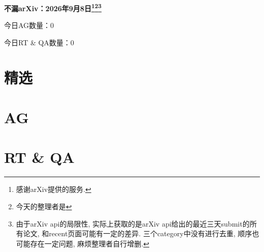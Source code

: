\documentclass[9pt, a4paper]{article}
\theoremstyle{plain}
\theoremstyle{definition}
\theoremstyle{remark}
\newcommand{\AGnumber}{0}
\newcommand{\RTQAnumber}{0}
\newcommand{\NewestDate}{2026年9月8日}
\newcommand{\todayarXiver}{} %
\begin{document}
\begin{center}
    \Huge\textbf{不漏arXiv：\NewestDate\footnote{感谢arXiv提供的服务.}\footnote{今天的整理者是\todayarXiver}\footnote{由于arXiv api的局限性, 实际上获取的是arXiv api给出的最近三天submit的所有论文, 和recent页面可能有一定的差异. 三个category中没有进行去重, 顺序也可能存在一定问题, 麻烦整理者自行增删.}} \\
\end{center}

\setcounter{section}{-1}

\begin{center}
    今日AG数量：\AGnumber
    
    今日RT \& QA数量：\RTQAnumber
    
\end{center}


\section{精选}


\section{AG}

\section{RT \& QA}
\end{document}
